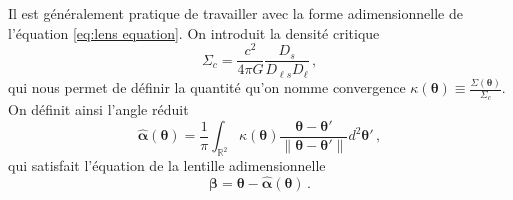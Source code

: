 Il est généralement pratique de travailler avec la forme adimensionnelle de l'équation \eqref{eq:lens equation}. 
On introduit la densité critique 
\begin{equation}\label{eq:densite critique}
        \Sigma_c = \frac{c^2}{4 \pi G}\frac{D_{s}}{D_{\ell s} D_\ell}\, ,
\end{equation} 
qui nous permet de définir la quantité qu'on nomme convergence $\displaystyle \kappa(\boldsymbol{ \theta} ) \equiv \frac{\Sigma(\boldsymbol{ \theta})}{\Sigma_c}$. 
On définit ainsi l'angle réduit 
\begin{equation}\label{eq:alpha adim}
        \hat{\boldsymbol{ \alpha}} (\boldsymbol{ \theta}) = \frac{1}{\pi}\int_{\mathbb{R}^{2}} \kappa(\boldsymbol{ \theta} )
        \frac{\boldsymbol{ \theta} - \boldsymbol{ \theta}'  }{\lVert \boldsymbol{ \theta} - \boldsymbol{ \theta}' \rVert  } d^{2}\boldsymbol{ \theta}'\, ,
\end{equation} 
qui satisfait l'équation de la lentille adimensionnelle 
\begin{equation}\label{eq:lens equation adim}
        \boldsymbol{ \beta} = \boldsymbol{ \theta} - \hat{\boldsymbol{ \alpha}}(\boldsymbol{ \theta})\, . 
\end{equation}




